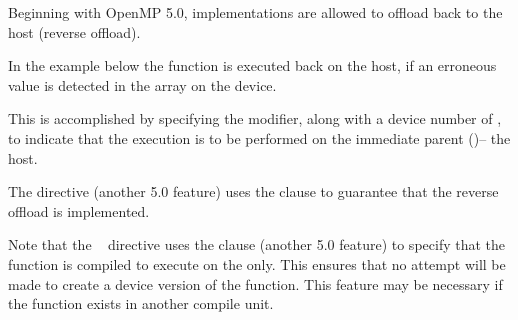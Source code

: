 
Beginning with OpenMP 5.0, implementations are allowed to
offload back to the host (reverse offload).

In the example below the  function
is executed back on the host, if an erroneous value is
detected in the  array on the device.

This is accomplished by specifying the 
 modifier, along with a device number of ,
to indicate that the execution is to be performed on the
immediate parent ()-- the host.

The  directive (another 5.0 feature)
uses the  clause to guarantee
that the reverse offload is implemented.

Note that the ~ directive uses the
 clause (another 5.0 feature) to specify that
the  function is compiled to
execute on the  only. This ensures that no
attempt will be made to create a device version of the
function.  This feature may be necessary if the function
exists in another compile unit.



